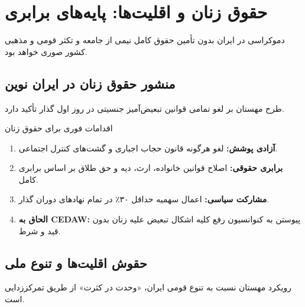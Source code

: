 \chapter{حقوق زنان و اقلیت‌ها: پایه‌های برابری}
\label{app:rights}

دموکراسی در ایران بدون تأمین حقوق کامل نیمی از جامعه و تکثر قومی و مذهبی کشور صوری خواهد بود.

\section{منشور حقوق زنان در ایران نوین}

طرح مهستان بر لغو تمامی قوانین تبعیض‌آمیز جنسیتی در روز اول گذار تأکید دارد.

\begin{modernbox}{اقدامات فوری برای حقوق زنان}
\begin{enumerate}
    \item \textbf{آزادی پوشش:} لغو هرگونه قانون حجاب اجباری و گشت‌های کنترل اجتماعی.
    \item \textbf{برابری حقوقی:} اصلاح قوانین خانواده، ارث، دیه و حق طلاق بر اساس برابری کامل.
    \item \textbf{مشارکت سیاسی:} اعمال سهمیه حداقل ۳۰٪ در تمام نهادهای دوران گذار.
    \item \textbf{الحاق به CEDAW:} پیوستن به کنوانسیون رفع کلیه اشکال تبعیض علیه زنان بدون قید و شرط.
\end{enumerate}
\end{modernbox}

\section{حقوش اقلیت‌ها و تنوع ملی}

رویکرد مهستان نسبت به تنوع قومی ایران، «وحدت در کثرت» از طریق تمرکززدایی است.

\begin{center}
\end{center}

